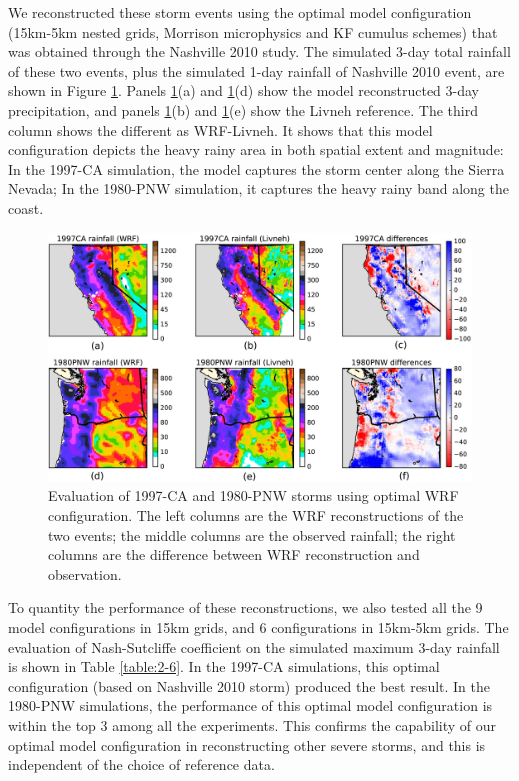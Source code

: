 We reconstructed these storm events using the optimal model configuration (15km-5km nested grids, Morrison microphysics and KF cumulus schemes) that was obtained through the Nashville 2010 study. The simulated 3-day total rainfall of these two events, plus the simulated 1-day rainfall of Nashville 2010 event, are shown in Figure \ref{fig:2-8}. Panels \ref{fig:2-8}(a) and \ref{fig:2-8}(d) show the model reconstructed 3-day precipitation, and panels \ref{fig:2-8}(b) and \ref{fig:2-8}(e) show the Livneh reference. The third column shows the different as WRF-Livneh. It shows that this model configuration depicts the heavy rainy area in both spatial extent and magnitude: In the 1997-CA simulation, the model captures the storm center along the Sierra Nevada; In the 1980-PNW simulation, it captures the heavy rainy band along the coast.

\begin{figure}[htbp]
  \includegraphics[width=\linewidth]{pics/ch2/fig8.jpg}
  \caption{Evaluation of 1997-CA and 1980-PNW storms using optimal WRF configuration. The left columns are the WRF reconstructions of the two events; the middle columns are the observed rainfall; the right columns are the difference between WRF reconstruction and observation.}
  \label{fig:2-8}
\end{figure}

To quantity the performance of these reconstructions, we also tested all the 9 model configurations in 15km grids, and 6 configurations in 15km-5km grids. The evaluation of Nash-Sutcliffe coefficient on the simulated maximum 3-day rainfall is shown in Table \ref{table:2-6}. In the 1997-CA simulations, this optimal configuration (based on Nashville 2010 storm) produced the best result. In the 1980-PNW simulations, the performance of this optimal model configuration is within the top 3 among all the experiments. This confirms the capability of our optimal model configuration in reconstructing other severe storms, and this is independent of the choice of reference data.

